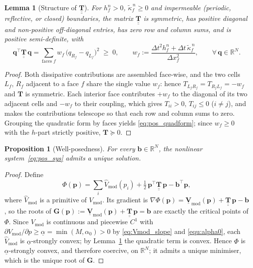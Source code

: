 \documentclass[a4paper,fleqn]{cas-sc}
\newtheorem{lemma}{Lemma}
\newtheorem{proposition}{Proposition}
\theoremstyle{definition}
\theoremstyle{remark}
\begin{document}
\begin{lemma}[Structure of $\underline{\underline{\mathbf{T}}}$]
\label{lem:pos_T}
For $h^{n}_{f}>0$, $\tilde{\kappa}^{\,n}_{f}\ge 0$ and impermeable (periodic,
reflective, or closed) boundaries, the matrix $\underline{\underline{\mathbf{T}}}$ is symmetric, has
positive diagonal and non-positive off-diagonal entries, has zero row and
column sums, and is positive semi-definite, with
\begin{equation}
\label{eq:pos_quadform}
\mathbf{q}^{\top}\underline{\underline{\mathbf{T}}}\,\mathbf{q}
 =\sum_{\text{faces }f} w_{f}\,\bigl(q_{R_{f}}-q_{L_{f}}\bigr)^{2}\;\ge\;0,
\qquad
w_{f}:=\frac{\Delta t^{2}h^{n}_{f}+\Delta t\,\tilde{\kappa}^{\,n}_{f}}
            {\Delta x_{f}^{2}},
\qquad\forall\,\mathbf{q}\in\mathbb{R}^{N}.
\end{equation}
\end{lemma}
\begin{proof}
Both dissipative contributions are assembled face-wise, and the two cells
$L_{f}$, $R_{f}$ adjacent to a face $f$ share the single value $w_{f}$: hence
$T_{L_{f}R_{f}}=T_{R_{f}L_{f}}=-w_{f}$ and $\mathbf{T}$ is symmetric. Each
interior face contributes $+w_{f}$ to the diagonal of its two adjacent cells
and $-w_{f}$ to their coupling, which gives $T_{ii}>0$, $T_{ij}\le 0$
($i\ne j$), and makes the contributions telescope so that each row and column
sums to zero. Grouping the quadratic form by faces yields \eqref{eq:pos_quadform}; since
$w_{f}\ge 0$ with the $h$-part strictly positive, $\mathbf{T}\succeq 0$.
\end{proof}


\begin{proposition}[Well-posedness]
\label{prop:pos_wellposed}
For every $\mathbf{b}\in\mathbb{R}^{N}$, the nonlinear system~\eqref{eq:pos_sys} admits a
unique solution.
\end{proposition}
\begin{proof}
Define
\begin{equation*}
\Phi(\mathbf{p})=\sum_i \widehat V_{\mathrm{mod}}(p_i)
+\tfrac12\,\mathbf{p}^{\top}\underline{\underline{\mathbf{T}}}\,\mathbf{p}
-\mathbf{b}^{\top}\mathbf{p},
\end{equation*}
where $\widehat V_{\mathrm{mod}}$ is a primitive of $V_{\mathrm{mod}}$. Its
gradient is
$\nabla\Phi(\mathbf{p})=\underline{\mathbf{V}}_{\mathrm{mod}}(\mathbf{p})
+\underline{\underline{\mathbf{T}}}\,\mathbf{p}-\mathbf{b}$, so the roots of
$\mathbf{G}(\mathbf{p}):=\underline{\mathbf{V}}_{\mathrm{mod}}(\mathbf{p})
+\underline{\underline{\mathbf{T}}}\,\mathbf{p}=\mathbf{b}$ are exactly the
critical points of $\Phi$. Since $V_{\mathrm{mod}}$ is continuous and
piecewise $C^{1}$ with
$\partial V_{\mathrm{mod}}/\partial p\ge\underline{\alpha}=\min(M,\alpha_0)>0$
by \eqref{eq:Vmod_slope} and \eqref{equ:alpha0}, each
$\widehat V_{\mathrm{mod}}$ is $\underline{\alpha}$-strongly convex; by
Lemma~\ref{lem:pos_T} the quadratic term is convex. Hence $\Phi$ is
$\underline{\alpha}$-strongly convex, and therefore coercive, on
$\mathbb{R}^{N}$; it admits a unique minimiser, which is the unique root of
$\mathbf{G}$.
\end{proof}
\end{document}
